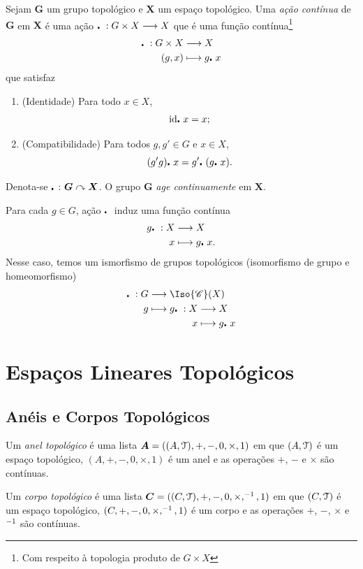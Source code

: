 \begin{defi}
Sejam $\bm G$ um grupo topológico e $\bm X$ um espaço topológico. Uma \emph{ação contínua} de $\bm G$ em $\bm X$ é uma ação $\mathord{\centerdot}\ : G \times X \longrightarrow X$ que é uma função contínua\footnote{Com respeito à topologia produto de $G \times X$}
	\begin{align*}
	{\mathord{\centerdot}\ }: {G \times X} &\longrightarrow {X} \\{(g,x)} &\longmapsto {g \mathord{\centerdot}\ x}
	\end{align*}
que satisfaz
	\begin{enumerate}
	\item (Identidade) Para todo $x \in X$,
		\begin{equation*}
		\mathrm{id}\mathord{\centerdot}\  x = x;
		\end{equation*}
	\item (Compatibilidade) Para todos $g,g' \in G$ e $x \in X$,
		\begin{equation*}
		(g'g)\mathord{\centerdot}\  x = g'\mathord{\centerdot}\ (g\mathord{\centerdot}\  x).
		\end{equation*}
	\end{enumerate}
Denota-se $\mathord{\centerdot}\ \colon \bm G \curvearrowright \bm X$. O grupo $\bm G$ \emph{age continuamente} em $\bm X$.
\end{defi}

Para cada $g \in G$, ação $\mathord{\centerdot}\ $ induz uma função contínua
	\begin{align*}
	{g\mathord{\centerdot}\ }: {X} &\longrightarrow {X} \\{x} &\longmapsto {g\mathord{\centerdot}\ x.}
	\end{align*}
Nesse caso, temos um ismorfismo de grupos topológicos (isomorfismo de grupo e homeomorfismo)
	\begin{align*}
	\func{\pt}{G}{\Iso{\cont}(X)}{g}{
		\begin{aligned}[t]
		\func{g\pt}{X}{X}{x}{g\pt x}
		\end{aligned}	
	}
	\end{align*}









\chapter{Espaços Lineares Topológicos}

\section{Anéis e Corpos Topológicos}

\begin{defi}
Um \emph{anel topológico} é uma lista $\bm A = ((A,\mathcal{T}),+,-,0,\times,1)$ em que $(A,\mathcal{T})$ é um espaço topológico, $(A,+,-,0,\times,1)$ é um anel e as operações $+$, $-$ e $\times$ são contínuas.

Um \emph{corpo topológico} é uma lista $\bm C = ((C,\mathcal{T}),+,-,0,\times,^{-1},1)$ em que $(C,\mathcal{T})$ é um espaço topológico, $(C,+,-,0,\times,^{-1},1)$ é um corpo e as operações $+$, $-$, $\times$ e $^{-1}$ são contínuas.
\end{defi}

